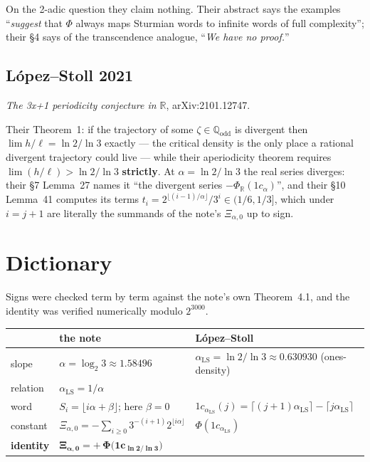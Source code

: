 \documentclass[10pt]{article}
\begin{document}
On the 2-adic question they claim nothing. Their abstract says the examples ``\emph{suggest} that
$\Phi$ always maps Sturmian words to infinite words of full complexity''; their \S4 says of the
transcendence analogue, ``\emph{We have no proof.}''

\subsection*{L\'opez--Stoll 2021 \cite{lopez2021periodicity}}

\emph{The 3x+1 periodicity conjecture in $\mathbb{R}$}, arXiv:2101.12747.

Their Theorem~1: if the trajectory of some $\zeta\in\mathbb{Q}_{\mathrm{odd}}$ is divergent then
$\lim h/\ell=\ln 2/\ln 3$ exactly --- the critical density is the only place a rational divergent
trajectory could live --- while their aperiodicity theorem requires $\lim(h/\ell)>\ln 2/\ln 3$
\textbf{strictly}. At $\alpha=\ln 2/\ln 3$ the real series diverges: their \S7 Lemma~27 names it
``the divergent series $-\Phi_{\mathbb{R}}(1c_\alpha)$'', and their \S10 Lemma~41 computes its
terms $t_i=2^{\lfloor (i-1)/\alpha\rfloor}/3^{i}\in(1/6,1/3]$, which under $i=j+1$ are literally
the summands of the note's $\Xi_{\alpha,0}$ up to sign.

\section{Dictionary}

Signs were checked term by term against the note's own Theorem~4.1, and the identity was verified
numerically modulo $2^{3000}$.

\begin{center}
\begin{tabular}{@{}lll@{}}
\toprule
& the note & L\'opez--Stoll \\
\midrule
slope & $\alpha=\log_2 3\approx 1.58496$ & $\alpha_{\mathrm{LS}}=\ln 2/\ln 3\approx 0.630930$ (ones-density)\\
relation & \multicolumn{2}{l}{$\alpha_{\mathrm{LS}}=1/\alpha$}\\
word & $S_i=\lfloor i\alpha+\beta\rfloor$; here $\beta=0$ & $1c_{\alpha_{\mathrm{LS}}}(j)=\lceil (j+1)\alpha_{\mathrm{LS}}\rceil-\lceil j\alpha_{\mathrm{LS}}\rceil$\\
constant & $\Xi_{\alpha,0}=-\sum_{i\ge0}3^{-(i+1)}2^{\lfloor i\alpha\rfloor}$ & $\Phi(1c_{\alpha_{\mathrm{LS}}})$\\
\textbf{identity} & \multicolumn{2}{l}{$\boldsymbol{\Xi_{\alpha,0}=+\,\Phi\bigl(1c_{\ln 2/\ln 3}\bigr)}$}\\
\bottomrule
\end{tabular}
\end{center}
\end{document}
